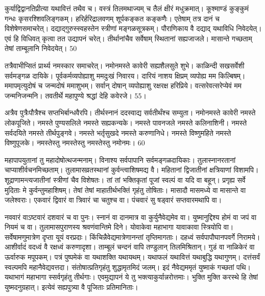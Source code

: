 कुर्याद्विद्वानतिप्रीत्या यथावित्तं तथैव च।
वस्त्रं तिलमथाज्यम् च तैलं क्षीरं मधुक्रमात्।
कूश्माण्डं कुङ्कुमं गन्धः कृसरश्शिवलिङ्गकम्।
हरिर्हरिद्रालवणम् शूर्पकङ्कत कङ्कणैः।
एतेषाम् तत्र दानं च विशेषेणसमाचरेत्।
दद्याद्गुरुस्स्वहस्तेन स्त्रीणां मङ्गळसूत्रकम्।
पौराणिकाय वै दद्याद् यथाविधि निवेदयेत्।
एवं हि विधिवत् कृत्वा तत उद्यापनं चरेत्।
तीर्थानांचैव सर्वेषाम् स्थितानां सह्यजाजले।
मासान्ते गच्छताम् तेषां ताम्बूलानि निवेदयेत्।
50

तत्रैवाभीप्सितं प्रार्थ्य नमस्कार समाचरेत्।
नमोनमस्ते कावेरी सह्यशैलसुते शुभे।
काळिन्दी सखसर्वेशी सर्वमङ्गळ दायिके।
पूर्वकर्मव्यपोह्याशु ममदुःखं निवारय।
दारियं नाशय क्षिप्रम् व्यपोह्य मम किल्बिषम्।
ममापमृत्युदोषं च जन्मदोषं ममाशुभम्।
सर्वान् दोषान् व्यपोह्याशु रक्षरक्ष हरिप्रिये।
वत्सरेवत्सरेप्येवं मम जन्मनिजन्मनि।
तवतीर्थे महापुण्ये श्रद्धां देहि कवेरजे।
55।



अत्रैव पुत्रैःपौत्रैश्च सप्तभिर्बान्धवैरपि।
तीर्थस्नानं ददस्वाद्य सर्वतीर्थंश्च सम्युता।
नमोनमस्ते कावेरी नमस्ते लोकपूजिते।
नमस्ते पुण्यसलिले नमस्ते सह्यकन्यके।
नमस्ते पावनजले नमस्ते कलिनाशिनी।
नमस्ते सर्वदयिते नमस्ते तीर्थपुङ्गवे।
नमस्ते भर्तृसुखदे नमस्ते करुणानिधे।
नमस्ते विष्णुमहिते नमस्ते विष्णुपूजके।
नमस्तेस्तु नमस्तेस्तु नमस्तेस्तु नमोनमः।
60

महापापयुतानां तु महादोषोत्थजन्मनाम्।
विनाश्य सर्वपापानि सर्वमङ्गळदायिकाः।
तुलास्नानरतानां चाप्याशीर्वचनमिच्छताम्।
तुलामासव्रतस्थानां कुर्वन्त्वाशिषमद्य वै।
महितानां द्विजातीनां क्षत्रियाणां विशामपि।
शूद्राणामन्त्यजातीनां स्त्रीणां चैव विशेषतः।
तां तां भक्तिकृतां पूजां स्वल्पं वा यदि वा बहून्।
प्रगृह्य सर्वे मुदिताः मे कुर्वन्तुमहाशिषम्।
तेषां तेषां माहातीर्थभक्तिं गृहंतु तोषिताः।
मासादौ मासमध्ये वा मासान्ते वा जलेश्वराः।
एकवारं द्विवारं वा त्रिवारं चा चतुश्च वा।
पंचवारं सु षड्वारं सप्तवारमथापि वा।

नववारं वाऽष्टवारं दशवारं च वा पुनः।
स्नानं वा दानमात्र वा कुर्युनैवेद्यमेव वा।
युष्मानुद्दिश्य होमं वा जपं वा नियमं च वा।
तुलामासपुराणस्य श्रवणंवान्तिमे दिने।
योवाकेवा महाभागा यावाकावा स्त्रियोपि वा।
सर्वेषामणुमात्रेण दृप्ता यूयं वरप्रदाः।
किंचिन्नैवेद्यमात्रेणानन्तां तृप्तिमागताः।
दहध्वं सर्वपापौघानपवर्गे निरामये।
आशीर्वादं वदध्वं वै रक्षध्वं करुणादृशा।
ताम्बूलं चन्दनं वापि तण्डुलान् तिलमिश्रितान्।
गुडं वा नाळिकेरं वा ऊर्वारुक मपूपकम्।
पत्रं पुष्पमेकं वा यथाशक्ति यथायथम्।
यथाफलं यथावित्तं यथाबुद्धि यथागुणम्।
दत्तंसर्वं स्वल्पमपि महानैवेद्यवत्तदा।
संतोषात्प्रतिगृहंतु शुद्धामृतमिदं जलम्।
इदं नैवेद्यममृतं युष्माकं गच्छतां पथि।
यथाभागं महाभागा स्सर्वगृहंतु तीर्थगाः।
एवमुद्यापनं ये तु भक्त्याकुर्यान्नरोत्तमाः।
भुक्ति मुक्ति करस्थे हि तेषां युष्मदनुग्रहात्।
इत्येवं सह्यपुत्र्या वै पूजिताः प्रतिमानिताः।

